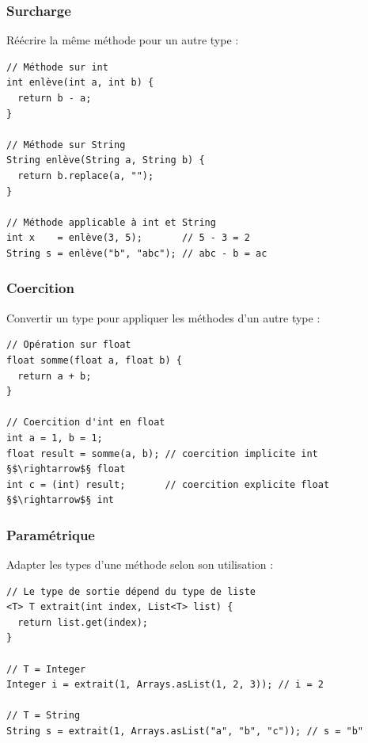 \documentclass[draft]{beamer}
\begin{document}
\begin{frame}[fragile]
\frametitle{Surcharge}
Réécrire la même méthode pour un autre type :
\begin{lstlisting}
// Méthode sur int
int enlève(int a, int b) {
  return b - a;
}

// Méthode sur String
String enlève(String a, String b) {
  return b.replace(a, "");
}

// Méthode applicable à int et String
int x    = enlève(3, 5);       // 5 - 3 = 2
String s = enlève("b", "abc"); // abc - b = ac
\end{lstlisting}
\end{frame}

\begin{frame}[fragile]
\frametitle{Coercition}
Convertir un type pour appliquer les méthodes d'un autre type :
\begin{lstlisting}
// Opération sur float
float somme(float a, float b) {
  return a + b;
}

// Coercition d'int en float
int a = 1, b = 1;
float result = somme(a, b); // coercition implicite int §$\rightarrow$§ float
int c = (int) result;       // coercition explicite float §$\rightarrow$§ int
\end{lstlisting}
\end{frame}

\begin{frame}[fragile]
\frametitle{Paramétrique}
Adapter les types d'une méthode selon son utilisation :
\begin{lstlisting}
// Le type de sortie dépend du type de liste
<T> T extrait(int index, List<T> list) {
  return list.get(index);
}

// T = Integer
Integer i = extrait(1, Arrays.asList(1, 2, 3)); // i = 2

// T = String
String s = extrait(1, Arrays.asList("a", "b", "c")); // s = "b"
\end{lstlisting}
\end{frame}
\end{document}
